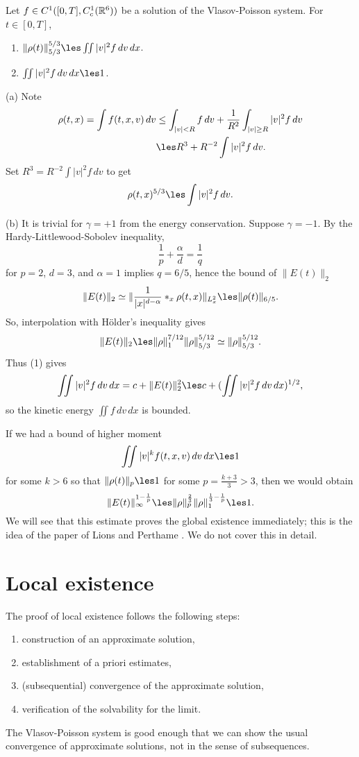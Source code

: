 \documentclass[11pt]{amsart}
\begin{document}
\begin{lem}
Let $f\in C^1([0,T],C_c^1(\mathbb{R}^6))$ be a solution of the Vlasov-Poisson system.
For $t\in[0,T]$,
\begin{enumerate}
\item $\|\rho(t)\|_{5/3}^{5/3}\les\iint|v|^2f\,dv\,dx$.
\item $\iint|v|^2f\,dv\,dx\les1$.
\end{enumerate}
\end{lem}
\begin{pf}
(a)
Note
\begin{align*}
\rho(t,x)=\int f(t,x,v)\,dv
&\le\int_{|v|<R}f\,dv+\frac1{R^2}\int_{|v|\ge R}|v|^2f\,dv\\
&\les R^3+ R^{-2}\int|v|^2f\,dv.
\end{align*}
Set $R^3=R^{-2}\int|v|^2f\,dv$ to get
\[\rho(t,x)^{5/3}\les\int|v|^2f\,dv.\]

(b)
It is trivial for $\gamma=+1$ from the energy conservation.
Suppose $\gamma=-1$.
By the Hardy-Littlewood-Sobolev inequality,
\[\frac1p+\frac\alpha d=\frac1q\]
for $p=2$, $d=3$, and $\alpha=1$ implies $q=6/5$, hence the bound of $\|E(t)\|_2$
\[\|E(t)\|_2\simeq\|\frac1{|x|^{d-\alpha}}*_x\rho(t,x)\|_{L_x^2}\les\|\rho(t)\|_{6/5}.\]
So, interpolation with H\"older's inequality gives
\[\|E(t)\|_2\les\|\rho\|_1^{7/12}\|\rho\|_{5/3}^{5/12}\simeq\|\rho\|_{5/3}^{5/12}.\]
Thus (1) gives
\[\iint|v|^2f\,dv\,dx=c+\|E(t)\|_2^2\les c+(\iint|v|^2f\,dv\,dx)^{1/2},\]
so the kinetic energy $\iint f\,dv\,dx$ is bounded.\qedhere
\end{pf}

\begin{rmk}
If we had a bound of higher moment
\[\iint|v|^kf(t,x,v)\,dv\,dx\les1\]
for some $k>6$ so that $\|\rho(t)\|_p\les1$ for some $p=\frac{k+3}3>3$, then we would obtain
\[\|E(t)\|_\infty^{1-\frac1p}\les\|\rho\|_p^{\frac23}\|\rho\|_1^{\frac13-\frac1p}\les1.\]
We will see that this estimate proves the global existence immediately; this is the idea of the paper of Lions and Perthame \cite{lions1991propagation}.
We do not cover this in detail.
\end{rmk}




\section{Local existence}

The proof of local existence follows the following steps:
\begin{enumerate}
\item construction of an approximate solution,
\item establishment of a priori estimates,
\item (subsequential) convergence of the approximate solution,
\item verification of the solvability for the limit.
\end{enumerate}
The Vlasov-Poisson system is good enough that we can show the usual convergence of approximate solutions, not in the sense of subsequences.
\end{document}
